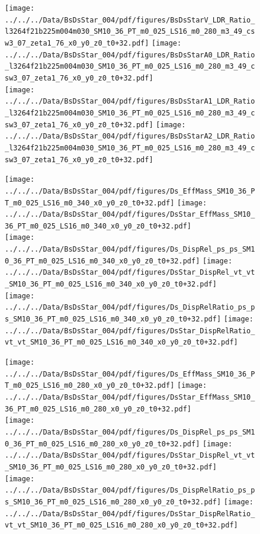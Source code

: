 \documentclass[a4paper,10pt]{article}
\begin{document}
\begin{figure}[p]
 \texttt{[image: ../../../Data/BsDsStar\_004/pdf/figures/BsDsStarV\_LDR\_Ratio\_l3264f21b225m004m030\_SM10\_36\_PT\_m0\_025\_LS16\_m0\_280\_m3\_49\_csw3\_07\_zeta1\_76\_x0\_y0\_z0\_t0+32.pdf]}  
\texttt{[image: ../../../Data/BsDsStar\_004/pdf/figures/BsDsStarA0\_LDR\_Ratio\_l3264f21b225m004m030\_SM10\_36\_PT\_m0\_025\_LS16\_m0\_280\_m3\_49\_csw3\_07\_zeta1\_76\_x0\_y0\_z0\_t0+32.pdf]} \\ 
\texttt{[image: ../../../Data/BsDsStar\_004/pdf/figures/BsDsStarA1\_LDR\_Ratio\_l3264f21b225m004m030\_SM10\_36\_PT\_m0\_025\_LS16\_m0\_280\_m3\_49\_csw3\_07\_zeta1\_76\_x0\_y0\_z0\_t0+32.pdf]}  
\texttt{[image: ../../../Data/BsDsStar\_004/pdf/figures/BsDsStarA2\_LDR\_Ratio\_l3264f21b225m004m030\_SM10\_36\_PT\_m0\_025\_LS16\_m0\_280\_m3\_49\_csw3\_07\_zeta1\_76\_x0\_y0\_z0\_t0+32.pdf]} \\ 
\end{figure} 
\clearpage

\begin{figure}[p]
 \texttt{[image: ../../../Data/BsDsStar\_004/pdf/figures/Ds\_EffMass\_SM10\_36\_PT\_m0\_025\_LS16\_m0\_340\_x0\_y0\_z0\_t0+32.pdf]}  
\texttt{[image: ../../../Data/BsDsStar\_004/pdf/figures/DsStar\_EffMass\_SM10\_36\_PT\_m0\_025\_LS16\_m0\_340\_x0\_y0\_z0\_t0+32.pdf]} \\ 
\texttt{[image: ../../../Data/BsDsStar\_004/pdf/figures/Ds\_DispRel\_ps\_ps\_SM10\_36\_PT\_m0\_025\_LS16\_m0\_340\_x0\_y0\_z0\_t0+32.pdf]}  
\texttt{[image: ../../../Data/BsDsStar\_004/pdf/figures/DsStar\_DispRel\_vt\_vt\_SM10\_36\_PT\_m0\_025\_LS16\_m0\_340\_x0\_y0\_z0\_t0+32.pdf]} \\ 
\texttt{[image: ../../../Data/BsDsStar\_004/pdf/figures/Ds\_DispRelRatio\_ps\_ps\_SM10\_36\_PT\_m0\_025\_LS16\_m0\_340\_x0\_y0\_z0\_t0+32.pdf]}  
\texttt{[image: ../../../Data/BsDsStar\_004/pdf/figures/DsStar\_DispRelRatio\_vt\_vt\_SM10\_36\_PT\_m0\_025\_LS16\_m0\_340\_x0\_y0\_z0\_t0+32.pdf]} \\ 
\end{figure} 
\clearpage

\begin{figure}[p]
 \texttt{[image: ../../../Data/BsDsStar\_004/pdf/figures/Ds\_EffMass\_SM10\_36\_PT\_m0\_025\_LS16\_m0\_280\_x0\_y0\_z0\_t0+32.pdf]}  
\texttt{[image: ../../../Data/BsDsStar\_004/pdf/figures/DsStar\_EffMass\_SM10\_36\_PT\_m0\_025\_LS16\_m0\_280\_x0\_y0\_z0\_t0+32.pdf]} \\ 
\texttt{[image: ../../../Data/BsDsStar\_004/pdf/figures/Ds\_DispRel\_ps\_ps\_SM10\_36\_PT\_m0\_025\_LS16\_m0\_280\_x0\_y0\_z0\_t0+32.pdf]}  
\texttt{[image: ../../../Data/BsDsStar\_004/pdf/figures/DsStar\_DispRel\_vt\_vt\_SM10\_36\_PT\_m0\_025\_LS16\_m0\_280\_x0\_y0\_z0\_t0+32.pdf]} \\ 
\texttt{[image: ../../../Data/BsDsStar\_004/pdf/figures/Ds\_DispRelRatio\_ps\_ps\_SM10\_36\_PT\_m0\_025\_LS16\_m0\_280\_x0\_y0\_z0\_t0+32.pdf]}  
\texttt{[image: ../../../Data/BsDsStar\_004/pdf/figures/DsStar\_DispRelRatio\_vt\_vt\_SM10\_36\_PT\_m0\_025\_LS16\_m0\_280\_x0\_y0\_z0\_t0+32.pdf]} \\ 
\end{figure} 
\clearpage
\end{document}
